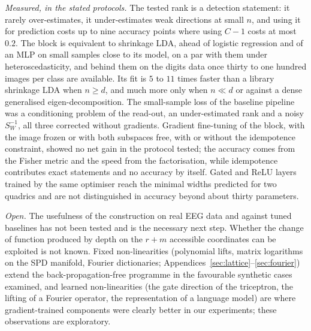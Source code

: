 \documentclass[11pt,a4paper]{article}
\theoremstyle{plain}
\theoremstyle{definition}
\theoremstyle{remark}
\begin{document}
\emph{Measured, in the stated protocols.} The tested rank is a detection
statement: it rarely over-estimates, it under-estimates weak directions at
small $n$, and using it for prediction costs up to nine accuracy points
where using $C-1$ costs at most $0.2$. The block is equivalent to shrinkage
LDA, ahead of logistic regression and of an MLP on small samples close to
its model, on a par with them under heteroscedasticity, and behind them on
the digits data once thirty to one hundred images per class are available.
Its fit is $5$ to $11$ times faster than a library shrinkage LDA when
$n\ge d$, and much more only when $n\ll d$ or against a dense generalised
eigen-decomposition. The small-sample loss of the baseline pipeline was a
conditioning problem of the read-out, an under-estimated rank and a noisy
$S_W^{-1}$, all three corrected without gradients. Gradient fine-tuning of
the block, with the image frozen or with both subspaces free, with or
without the idempotence constraint, showed no net gain in the protocol
tested; the accuracy comes from the Fisher metric and the speed from the
factorisation, while idempotence contributes exact statements and no
accuracy by itself. Gated and ReLU layers trained by the same optimiser
reach the minimal widths predicted for two quadrics and are not
distinguished in accuracy beyond about thirty parameters.

\emph{Open.} The usefulness of the construction on real EEG data and
against tuned baselines has not been tested and is the necessary next
step. Whether the change of function produced by depth on the $r+m$
accessible coordinates can be exploited is not known. Fixed
non-linearities (polynomial lifts, matrix logarithms on the SPD manifold,
Fourier dictionaries; Appendices~\ref{sec:lattice}--\ref{sec:fourier})
extend the back-propagation-free programme in the favourable synthetic
cases examined, and learned non-linearities (the gate direction of the
triceptron, the lifting of a Fourier operator, the representation of a
language model) are where gradient-trained components were clearly better
in our experiments; these observations are exploratory.

\appendix
\end{document}
